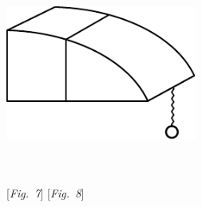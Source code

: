 \hspace{1mm}
\begin{minipage}[t]{0.5\textwidth}
\includegraphics[width=0.47\textwidth]{gesamttex/edit_VIII,3/images/LH_35_14_02_039r2_d7.pdf}
\end{minipage}
\\
\\
\hspace*{26mm} [\textit{Fig.~7}]\label{LH_35_14_02_039r2_Fig.7}\hspace*{58mm} [\textit{Fig.~8}]\label{LH_35_14_02_039r2_Fig.8}
\pend
%
%
%
%
%
\count{}
\count{}
\count{}
%
%